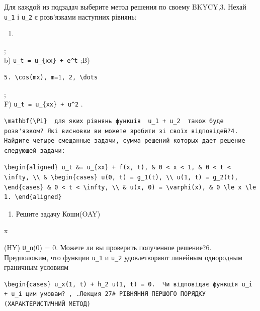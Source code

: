\documentclass[
  ukrainian,
]{article}
\providecommand{\tightlist}{%
  \setlength{\itemsep}{0pt}\setlength{\parskip}{0pt}}
\begin{document}
Для каждой из подзадач выберите метод решения по своему BKYCY,3. Нехай
\texttt{u\_1} і \texttt{u\_2} є розв'язками наступних рівнянь:

\begin{enumerate}
\def\labelenumi{\alph{enumi})}
\tightlist
\item
\end{enumerate}

;\\
b) \texttt{u\_t\ =\ u\_\{xx\}\ +\ e\^{}t} ;B)

\begin{verbatim}
5. \cos(mx), m=1, 2, \dots
\end{verbatim}

;\\
F) \texttt{u\_t\ =\ u\_\{xx\}\ +\ u\^{}2} .

\begin{verbatim}
\mathbf{\Pi}  для яких рівнянь функція  u_1 + u_2  також буде розв'язком? Які висновки ви можете зробити зі своїх відповідей?4. Найдите четыре смещанные задачи, сумма решений которых дает решение следующей задачи:
\end{verbatim}

\begin{verbatim}
\begin{aligned} u_t &= u_{xx} + f(x, t), & 0 < x < 1, & 0 < t < \infty, \\ & \begin{cases} u(0, t) = g_1(t), \\ u(1, t) = g_2(t), \end{cases} & 0 < t < \infty, \\ & u(x, 0) = \varphi(x), & 0 \le x \le 1. \end{aligned}
\end{verbatim}

\begin{enumerate}
\def\labelenumi{\arabic{enumi}.}
\setcounter{enumi}{4}
\tightlist
\item
  Решите задачу Коши(OAY)
\end{enumerate}

x

(HY) \texttt{U\_n}(0) = 0. Можете ли вы проверить полученное решение?6.
Предположим, что функции \texttt{u\_1} и \texttt{u\_2} удовлетворяют
линейным однородным граничным условиям

\begin{verbatim}
\begin{cases} u_x(1, t) + h_2 u(1, t) = 0.  Чи відповідає функція u_i + u_i цим умовам? , .Лекция 27# РІВНЯННЯ ПЕРШОГО ПОРЯДКУ (ХАРАКТЕРИСТИЧНИЙ МЕТОД)
\end{verbatim}
\end{document}
